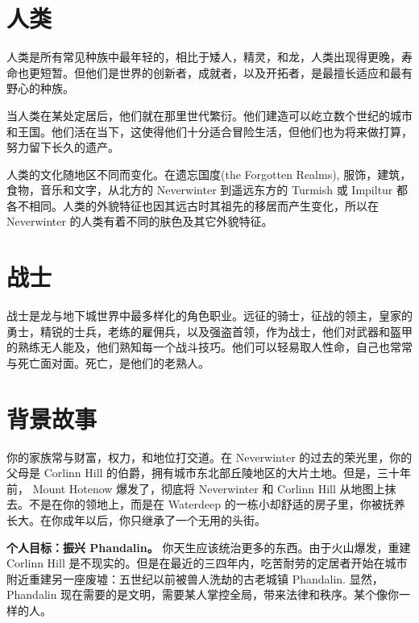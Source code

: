 \documentclass[letterpaper,twocolumn,openany,nodeprecatedcode]{dndbook}
\begin{document}



\mainmatter%

\section{人类}

\small

人类是所有常见种族中最年轻的，相比于矮人，精灵，和龙，人类出现得更晚，寿命也更短暂。但他们是世界的创新者，成就者，以及开拓者，是最擅长适应和最有野心的种族。

当人类在某处定居后，他们就在那里世代繁衍。他们建造可以屹立数个世纪的城市和王国。他们活在当下，这使得他们十分适合冒险生活，但他们也为将来做打算，努力留下长久的遗产。

人类的文化随地区不同而变化。在遗忘国度(the Forgotten Realms), 服饰，建筑，食物，音乐和文字，从北方的 Neverwinter 到遥远东方的 Turmish 或 Impiltur 都各不相同。人类的外貌特征也因其远古时其祖先的移居而产生变化，所以在 Neverwinter 的人类有着不同的肤色及其它外貌特征。

\section{战士}

战士是龙与地下城世界中最多样化的角色职业。远征的骑士，征战的领主，皇家的勇士，精锐的士兵，老练的雇佣兵，以及强盗首领，作为战士，他们对武器和盔甲的熟练无人能及，他们熟知每一个战斗技巧。他们可以轻易取人性命，自己也常常与死亡面对面。死亡，是他们的老熟人。

\section{背景故事}

你的家族常与财富，权力，和地位打交道。在 Neverwinter 的过去的荣光里，你的父母是 Corlinn Hill 的伯爵，拥有城市东北部丘陵地区的大片土地。但是，三十年前， Mount Hotenow 爆发了，彻底将 Neverwinter 和 Corlinn Hill 从地图上抹去。不是在你的领地上，而是在 Waterdeep 的一栋小却舒适的房子里，你被抚养长大。在你成年以后，你只继承了一个无用的头街。

\textbf{个人目标：振兴 Phandalin。} 你天生应该统治更多的东西。由于火山爆发，重建 Corlinn Hill 是不现实的。但是在最近的三四年内，吃苦耐劳的定居者开始在城市附近重建另一座废墟：五世纪以前被兽人洗劫的古老城镇 Phandalin. 显然，Phandalin 现在需要的是文明，需要某人掌控全局，带来法律和秩序。某个像你一样的人。
\end{document}
